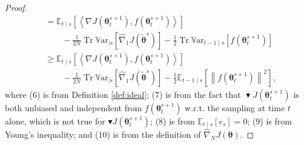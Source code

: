 \documentclass{article}
\makeatletter
\theoremstyle{remark}
\theoremstyle{definition}
\DeclareRobustCommand{\wrt}{w.r.t.\@\xspace}
\DeclareMathOperator{\Tr}{Tr}
\newcommand{\norm}[2][\infty]{\left\|#2\right\|_{#1}}
\newcommand{\dotprod}[2]{\left\langle#1,#2\right\rangle}
\newcommand{\vtheta}{\boldsymbol{\theta}}
\newcommand{\gradJ}[1]{\nabla J(#1)}
\newcommand{\gradApp}[2]{\hat{\nabla}_{#2}J(#1)}
\newcommand{\Ets}[2][t]{\mathbb{E}_{#1\mid s}\left[#2\right]}
\newcommand{\Varts}[2][t]{{\mathbb{V}\text{ar}}_{#1\mid s}\left[#2\right]}
\newcommand{\gradBlack}[1]{\blacktriangledown J(#1)}
\newcommand{\gradIdeal}[1]{\overline{\blacktriangledown} J(#1)}
\makeatother
\begin{document}
\begin{proof}
\begin{align}
	&=
	\Ets{\dotprod{\gradJ{\vtheta_t^{s+1}}}{f(\vtheta_t^{s+1})}} \nonumber\\
	&\qquad-
	\frac{1}{2N}\Tr\Varts[]{\gradApp{\tilde{\vtheta}^s}{1}} -\frac{1}{2}\Tr\Varts[t-1]{f(\vtheta_t^{s+1})} \\
	&\geq
	\Ets{\dotprod{\gradJ{\vtheta_t^{s+1}}}{f(\vtheta_t^{s+1})}} \nonumber\\
	&\qquad-
	\frac{1}{2N}\Tr\Varts[]{\gradApp{\tilde{\vtheta}^s}{1}} -\frac{1}{2}\Ets[t-1]{\norm[]{f(\vtheta_t^{s+1})}^2},\nonumber
\end{align}
where (6) is from Definition \ref{def:ideal}; (7) is from the fact that $\gradIdeal{\vtheta_t^{s+1}}$ is both unbiased and independent from $f(\vtheta_t^{s+1})$ \wrt the sampling at time $t$ alone, which is not true for $\gradBlack{\vtheta_t^{s+1}}$; (8) is from $\Ets{e_s}=0$; (9) is from Young's inequality; and (10) is from the definition of $\gradApp{\vtheta}{N}$.
\end{proof}
\end{document}
